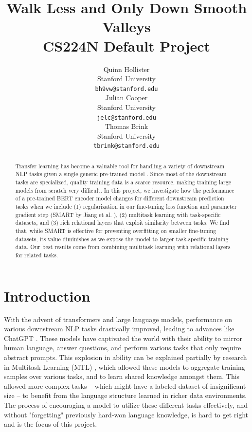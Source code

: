 \documentclass{article}
\title{
  Walk Less and Only Down Smooth Valleys \\
  \vspace{0.15cm}
  \large \normalfont CS224N Default Project  %
}
\author{
  Quinn Hollister \\
  Stanford University \\
  \texttt{bh9vw@stanford.edu} \\
   \And
    Julian Cooper \\
  Stanford University \\
  \texttt{jelc@stanford.edu} \\
   \And
   Thomas Brink \\
  Stanford University \\
  \texttt{tbrink@stanford.edu} \\
}
\begin{document}
\maketitle
\vspace{-0.4cm}
\begin{abstract}
  Transfer learning has become a valuable tool for handling a variety of downstream NLP tasks given a single generic pre-trained model \cite{weiss2016survey}. Since most of the downstream tasks are specialized, quality training data is a scarce resource, making training large models from scratch very difficult. 
  In this project, we investigate how the performance of a pre-trained BERT encoder model changes for different downstream prediction tasks when we include (1) regularization in our fine-tuning loss function and parameter gradient step (SMART by Jiang et al. \cite{smart}), (2) multitask learning with task-specific datasets, and (3) rich relational layers that exploit similarity between tasks.
  We find that, while SMART is effective for preventing overfitting on smaller fine-tuning datasets, its value diminishes as we expose the model to larger task-specific training data. Our best results come from combining multitask learning with relational layers for related tasks. 
\end{abstract}
\vspace{-0.8cm}

\section{Introduction}

With the advent of transformers and large language models, performance on various downstream NLP tasks drastically improved, leading to advances like ChatGPT \cite{openai2023gpt4}. These models have captivated the world with their ability to mirror human language, answer questions, and perform various tasks that only require abstract prompts. This explosion in ability can be explained partially by research in Multitask Learning (MTL) \cite{intro}, which allowed these models to aggregate training samples over various tasks, and to learn shared knowledge amongst them. This allowed more complex tasks -- which might have a labeled dataset of insignificant size -- to benefit from the language structure learned in richer data environments. The process of encouraging a model to utilize these different tasks effectively, and without "forgetting" previously hard-won language knowledge, is hard to get right and is the focus of this project. 
\end{document}
